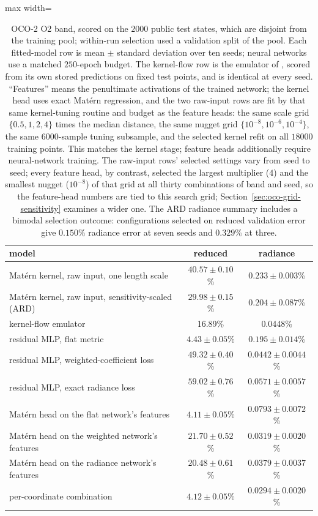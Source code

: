 \documentclass[twoside,11pt]{article}
\begin{document}
\begin{table}[t]
\centering

\begin{adjustbox}{max width=\linewidth}
\begin{tabular}{lcc}
\toprule
model & reduced & radiance \\
\midrule
Mat\'ern kernel, raw input, one length scale & $40.57\pm0.10$\% & $0.233\pm0.003$\% \\
Mat\'ern kernel, raw input, sensitivity-scaled (ARD) & $29.98\pm0.15$\% & $0.204\pm0.087$\% \\
kernel-flow emulator \citep{susiluoto2025radiative} & 16.89\% & 0.0448\% \\
residual MLP, flat metric & $4.43\pm0.05$\% & $0.195\pm0.014$\% \\
residual MLP, weighted-coefficient loss & $49.32\pm0.40$\% & $0.0442\pm0.0044$\% \\
residual MLP, exact radiance loss & $59.02\pm0.76$\% & $0.0571\pm0.0057$\% \\
Mat\'ern head on the flat network's features & $4.11\pm0.05$\% & $0.0793\pm0.0072$\% \\
Mat\'ern head on the weighted network's features & $21.70\pm0.52$\% & $0.0319\pm0.0020$\% \\
Mat\'ern head on the radiance network's features & $20.48\pm0.61$\% & $0.0379\pm0.0037$\% \\
per-coordinate combination & $\mathbf{4.12\pm0.05}$\% & $\mathbf{0.0294\pm0.0020}$\% \\
\bottomrule
\end{tabular}
\end{adjustbox}
\caption{OCO-2 O2 band, scored on the $2000$ public test states, which are
disjoint from the training pool; within-run selection used a validation
split of the pool. Each fitted-model row is mean $\pm$ standard deviation over ten
seeds; neural networks use a matched $250$-epoch budget. The
kernel-flow row is the emulator of \citet{susiluoto2025radiative}, scored
from its own stored predictions on fixed test points, and is identical at
every seed. ``Features'' means the penultimate
activations of the trained network; the kernel head uses exact
Mat\'ern regression, and the two raw-input rows
are fit by that same kernel-tuning routine and budget as the feature heads:
the same scale grid $\{0.5,1,2,4\}$ times the median distance, the same
nugget grid $\{10^{-8},10^{-6},10^{-4}\}$, the same $6000$-sample tuning
subsample, and the selected kernel refit on all $18000$ training points. This matches the kernel stage; feature heads additionally require neural-network training. The
raw-input rows' selected settings vary from seed to seed; every feature head,
by contrast, selected the largest multiplier ($4$) and the smallest nugget
($10^{-8}$) of that grid at all thirty combinations of band and seed, so the feature-head
numbers are tied to this search grid; Section~\ref{sec:oco-grid-sensitivity}
examines a wider one. The ARD radiance summary includes a bimodal selection
outcome: configurations selected on reduced validation error give
$0.150\%$ radiance error at seven seeds and $0.329\%$ at three.}
\label{tab:oco2}
\end{table}
\end{document}
